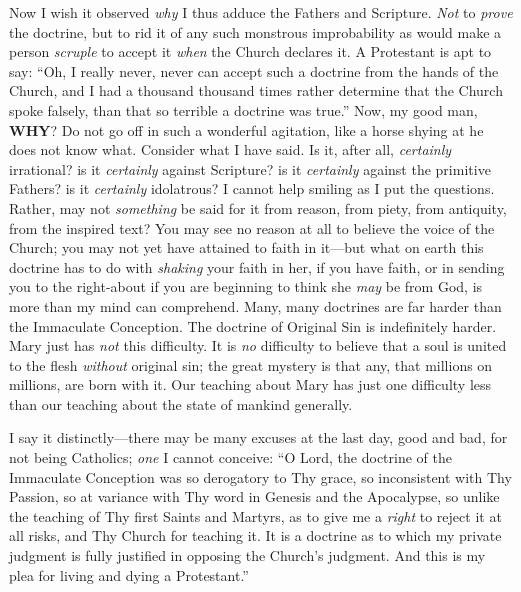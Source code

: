 Now I wish it observed \emph{why}
I thus adduce the Fathers and Scripture. \emph{Not} to \emph{prove} the
doctrine, but to rid it of any such monstrous improbability as would
make a person \emph{scruple} to accept it \emph{when} the Church
declares it. A Protestant is apt to say: ``Oh, I really never, never can
accept such a doctrine from the hands of the Church, and I had a
thousand thousand times rather determine that the Church spoke falsely,
than that so terrible a doctrine was true.'' Now, my good man, \textbf{WHY}?
Do not go off in such a wonderful agitation, like a horse shying at he
does not know what. Consider what I have said. Is it, after all, \emph{certainly}
irrational? is it \emph{certainly} against Scripture? is it \emph{certainly}
against the primitive Fathers? is it \emph{certainly} idolatrous? I
cannot help smiling as I put the questions. Rather, may not \emph{something}
be said for it from reason, from piety, from antiquity, from the
inspired text? You may see no reason at all to believe the voice of the
Church; you may not yet have attained to faith in it—but what on earth
this doctrine has to do with \emph{shaking} your faith in her, if you
have faith, or in sending you to the right-about if you are beginning to
think she \emph{may} be from God, is more than my mind can comprehend.
Many, many doctrines are far harder than the Immaculate Conception. The
doctrine of Original Sin is indefinitely harder. Mary just has \emph{not}
this difficulty. It is \emph{no} difficulty to believe that a soul is
united to the flesh \emph{without} original sin; the great mystery is
that any, that millions on millions, are born with it. Our teaching
about Mary has just one difficulty less than our teaching about the
state of mankind generally.

I say it distinctly—there may
be many excuses at the last day, good and bad, for not being Catholics; \emph{one}
I cannot conceive: ``O Lord, the doctrine of the Immaculate Conception
was so derogatory to Thy grace, so inconsistent with Thy Passion, so at
variance with Thy word in Genesis and the Apocalypse, so unlike the
teaching of Thy first Saints and Martyrs, as to give me a \emph{right}
to reject it at all risks, and Thy Church for teaching it. It is a
doctrine as to which my private judgment is fully justified in opposing
the Church's judgment. And this is my plea for living and dying a
Protestant.''


